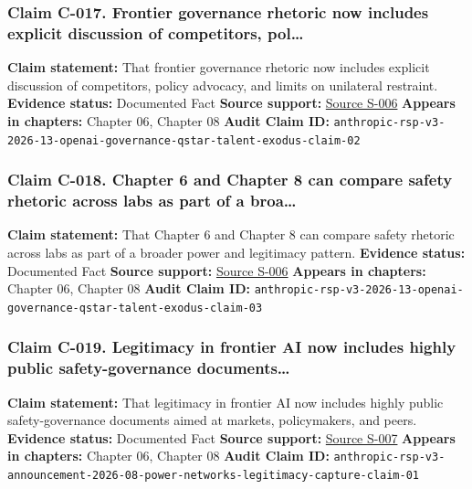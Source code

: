 \documentclass[
  american,
  11pt,
  letterpaper,
]{article}
\begin{document}
\subsubsection{Claim C-017. Frontier governance rhetoric now includes
explicit discussion of competitors,
pol\ldots{}}\label{claim-c-017-frontier-governance-rhetoric-now-includes-explicit-discussion-of-competitors-pol}

\textbf{Claim statement:} That frontier governance rhetoric now includes
explicit discussion of competitors, policy advocacy, and limits on
unilateral restraint. \textbf{Evidence status:} Documented Fact
\textbf{Source support:}
\hyperref[source-s-006-anthropics-responsible-scaling-policy-version-30]{Source
S-006} \textbf{Appears in chapters:} Chapter 06, Chapter 08
\textbf{Audit Claim ID:}
\texttt{anthropic-rsp-v3-2026-13-openai-governance-qstar-talent-exodus-claim-02}

\subsubsection{Claim C-018. Chapter 6 and Chapter 8 can compare safety
rhetoric across labs as part of a
broa\ldots{}}\label{claim-c-018-chapter-6-and-chapter-8-can-compare-safety-rhetoric-across-labs-as-part-of-a-broa}

\textbf{Claim statement:} That Chapter 6 and Chapter 8 can compare
safety rhetoric across labs as part of a broader power and legitimacy
pattern. \textbf{Evidence status:} Documented Fact \textbf{Source
support:}
\hyperref[source-s-006-anthropics-responsible-scaling-policy-version-30]{Source
S-006} \textbf{Appears in chapters:} Chapter 06, Chapter 08
\textbf{Audit Claim ID:}
\texttt{anthropic-rsp-v3-2026-13-openai-governance-qstar-talent-exodus-claim-03}

\subsubsection{Claim C-019. Legitimacy in frontier AI now includes
highly public safety-governance
documents\ldots{}}\label{claim-c-019-legitimacy-in-frontier-ai-now-includes-highly-public-safety-governance-documents}

\textbf{Claim statement:} That legitimacy in frontier AI now includes
highly public safety-governance documents aimed at markets,
policymakers, and peers. \textbf{Evidence status:} Documented Fact
\textbf{Source support:}
\hyperref[source-s-007-responsible-scaling-policy-version-3-0]{Source
S-007} \textbf{Appears in chapters:} Chapter 06, Chapter 08
\textbf{Audit Claim ID:}
\texttt{anthropic-rsp-v3-announcement-2026-08-power-networks-legitimacy-capture-claim-01}
\end{document}
